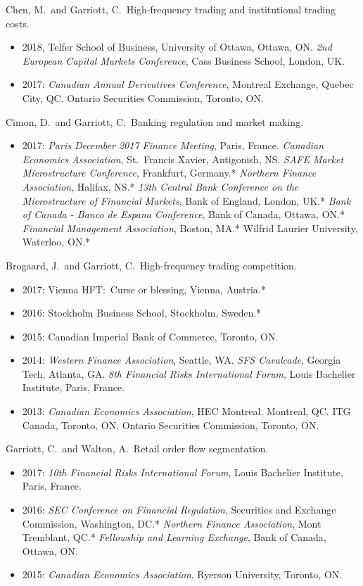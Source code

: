 \documentclass[11pt,letterpaper]{article}
\begin{document}
\medskip
\noindent Chen, M.~and Garriott, C.~High-frequency trading and institutional trading costs.
\begin{itemize}[noitemsep]
  \item 2018, Telfer School of Business, University of Ottawa, Ottawa, ON. \textit{2nd European Capital Markets Conference}, Cass Business School, London, UK.
  \item 2017: \textit{Canadian Annual Derivatives Conference}, Montreal Exchange, Quebec City, QC. Ontario Securities Commission, Toronto, ON.
\end{itemize}

\medskip
\noindent Cimon, D.~and Garriott, C.~Banking regulation and market making.
\begin{itemize}[noitemsep]
  \item 2017: \textit{Paris December 2017 Finance Meeting}, Paris, France. \textit{Canadian Economics Association}, St.~Francis Xavier, Antigonish, NS. \textit{SAFE Market Microstructure Conference}, Frankfurt, Germany.* \textit{Northern Finance Association}, Halifax, NS.* \textit{13th Central Bank Conference on the Microstructure of Financial Markets}, Bank of England, London, UK.* \textit{Bank of Canada - Banco de Espana Conference}, Bank of Canada, Ottawa, ON.* \textit{Financial Management Association}, Boston, MA.* Wilfrid Laurier University, Waterloo, ON.*
\end{itemize}

\medskip
\noindent Brogaard, J.~and Garriott, C.~High-frequency trading competition.
\begin{itemize}[noitemsep]
  \item 2017: Vienna HFT:~Curse or blessing, Vienna, Austria.*
  \item 2016: Stockholm Business School, Stockholm, Sweden.*
  \item 2015: Canadian Imperial Bank of Commerce, Toronto, ON.
  \item 2014: \textit{Western Finance Association}, Seattle, WA. \textit{SFS Cavalcade}, Georgia Tech, Atlanta, GA. \textit{8th Financial Risks International Forum}, Louis Bachelier Institute, Paris, France.
  \item 2013: \textit{Canadian Economics Association}, HEC Montreal, Montreal, QC. ITG Canada, Toronto, ON. Ontario Securities Commission, Toronto, ON.
\end{itemize}

\medskip
{}
\noindent Garriott, C.~and Walton, A.~Retail order flow segmentation.
\begin{itemize}[noitemsep]
  \item 2017: \textit{10th Financial Risks International Forum}, Louis Bachelier Institute, Paris, France.
  \item 2016: \textit{SEC Conference on Financial Regulation}, Securities and Exchange Commission, Washington, DC.* \textit{Northern Finance Association}, Mont Tremblant, QC.* \textit{Fellowship and Learning Exchange}, Bank of Canada, Ottawa, ON. 
  \item 2015: \textit{Canadian Economics Association}, Ryerson University, Toronto, ON.
\end{itemize}
\end{document}
